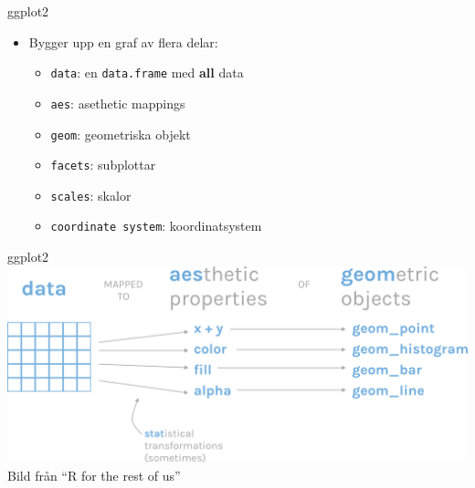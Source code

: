 \documentclass[
  11pt,
  ignorenonframetext,
  handout]{beamer}
\providecommand{\tightlist}{%
  \setlength{\itemsep}{0pt}\setlength{\parskip}{0pt}}
\begin{document}
\begin{frame}{ggplot2}
\label{ggplot2-2}
\begin{itemize}
\tightlist
\item
  Bygger upp en graf av flera delar:

  \begin{itemize}
  \tightlist
  \item
    \texttt{data}: en \texttt{data.frame} med \textbf{all} data
  \item
    \texttt{aes}: asethetic mappings
  \item
    \texttt{geom}: geometriska objekt
  \item
    \texttt{facets}: subplottar
  \item
    \texttt{scales}: skalor
  \item
    \texttt{coordinate system}: koordinatsystem
  \end{itemize}
\end{itemize}
\end{frame}

\begin{frame}{ggplot2}
\label{ggplot2-3}
\includegraphics{images/grammar-of-graphics.png} Bild från ``R for the
rest of us''
\end{frame}
\end{document}

